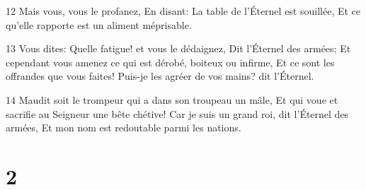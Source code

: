 \par 12 Mais vous, vous le profanez, En disant: La table de l'Éternel est souillée, Et ce qu'elle rapporte est un aliment méprisable.
\par 13 Vous dites: Quelle fatigue! et vous le dédaignez, Dit l'Éternel des armées; Et cependant vous amenez ce qui est dérobé, boiteux ou infirme, Et ce sont les offrandes que vous faites! Puis-je les agréer de vos mains? dit l'Éternel.
\par 14 Maudit soit le trompeur qui a dans son troupeau un mâle, Et qui voue et sacrifie au Seigneur une bête chétive! Car je suis un grand roi, dit l'Éternel des armées, Et mon nom est redoutable parmi les nations.

\chapter{2}

